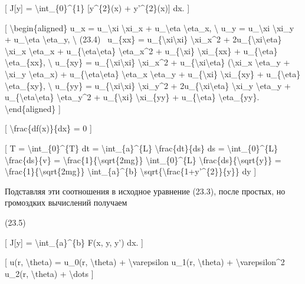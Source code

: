 \documentclass[
]{article}
\begin{document}
{[} J{[}y{]} = \textbackslash int\_\{0\}\^{}\{1\} {[}y\^{}\{2\}(x) +
y'\^{}\{2\}(x){]} dx. {]}

{[} \textbackslash begin\{aligned\} u\_x = u\_\textbackslash xi
\textbackslash xi\_x + u\_\textbackslash eta \textbackslash eta\_x,
\textbackslash{} u\_y = u\_\textbackslash xi \textbackslash xi\_y +
u\_\textbackslash eta \textbackslash eta\_y, \textbackslash{} (23.4)
~u\_\{xx\} = u\_\{\textbackslash xi\textbackslash xi\}
\textbackslash xi\_x\^{}2 + 2u\_\{\textbackslash xi\textbackslash eta\}
\textbackslash xi\_x \textbackslash eta\_x +
u\_\{\textbackslash eta\textbackslash eta\} \textbackslash eta\_x\^{}2 +
u\_\{\textbackslash xi\} \textbackslash xi\_\{xx\} +
u\_\{\textbackslash eta\} \textbackslash eta\_\{xx\}, \textbackslash{}
u\_\{xy\} = u\_\{\textbackslash xi\textbackslash xi\}
\textbackslash xi\_x\^{}2 + u\_\{\textbackslash xi\textbackslash eta\}
(\textbackslash xi\_x \textbackslash eta\_y + \textbackslash xi\_y
\textbackslash eta\_x) + u\_\{\textbackslash eta\textbackslash eta\}
\textbackslash eta\_x \textbackslash eta\_y + u\_\{\textbackslash xi\}
\textbackslash xi\_\{xy\} + u\_\{\textbackslash eta\}
\textbackslash eta\_\{xy\}, \textbackslash{} u\_\{yy\} =
u\_\{\textbackslash xi\textbackslash xi\} \textbackslash xi\_y\^{}2 +
2u\_\{\textbackslash xi\textbackslash eta\} \textbackslash xi\_y
\textbackslash eta\_y + u\_\{\textbackslash eta\textbackslash eta\}
\textbackslash eta\_y\^{}2 + u\_\{\textbackslash xi\}
\textbackslash xi\_\{yy\} + u\_\{\textbackslash eta\}
\textbackslash eta\_\{yy\}. \textbackslash end\{aligned\} {]}

{[} \textbackslash frac\{df(x)\}\{dx\} = 0 {]}

{[} T = \textbackslash int\_\{0\}\^{}\{T\} dt =
\textbackslash int\_\{a\}\^{}\{L\} \textbackslash frac\{dt\}\{ds\} ds =
\textbackslash int\_\{0\}\^{}\{L\} \textbackslash frac\{ds\}\{v\} =
\textbackslash frac\{1\}\{\textbackslash sqrt\{2mg\}\}
\textbackslash int\_\{0\}\^{}\{L\}
\textbackslash frac\{ds\}\{\textbackslash sqrt\{y\}\} =
\textbackslash frac\{1\}\{\textbackslash sqrt\{2mg\}\}
\textbackslash int\_\{a\}\^{}\{b\}
\textbackslash sqrt\{\textbackslash frac\{1+y'\^{}\{2\}\}\{y\}\} dy {]}

Подставляя эти соотношения в исходное уравнение (23.3), после простых,
но громоздких вычислений получаем

(23.5)

{[} J{[}y{]} = \textbackslash int\_\{a\}\^{}\{b\} F(x, y, y') dx. {]}

{[} u(r, \textbackslash theta) = u\_0(r, \textbackslash theta) +
\textbackslash varepsilon u\_1(r, \textbackslash theta) +
\textbackslash varepsilon\^{}2 u\_2(r, \textbackslash theta) +
\textbackslash dots {]}
\end{document}
